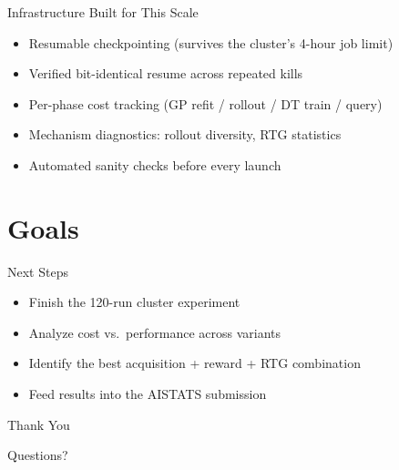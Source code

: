 \documentclass{beamer}
\begin{document}
\begin{frame}{Infrastructure Built for This Scale}
    \begin{itemize}
        \item Resumable checkpointing (survives the cluster's 4-hour job limit)
        \item Verified bit-identical resume across repeated kills
        \item Per-phase cost tracking (GP refit / rollout / DT train / query)
        \item Mechanism diagnostics: rollout diversity, RTG statistics
        \item Automated sanity checks before every launch
    \end{itemize}
\end{frame}

\section{Goals}

\begin{frame}{Next Steps}
    \begin{itemize}
        \item Finish the 120-run cluster experiment
        \item Analyze cost vs.\ performance across variants
        \item Identify the best acquisition + reward + RTG combination
        \item Feed results into the AISTATS submission
    \end{itemize}
\end{frame}

\begin{frame}
    \begin{center}
        {\Huge\calligra Thank You}
        \vspace{1cm}

        {\large Questions?}
    \end{center}
\end{frame}
\end{document}
